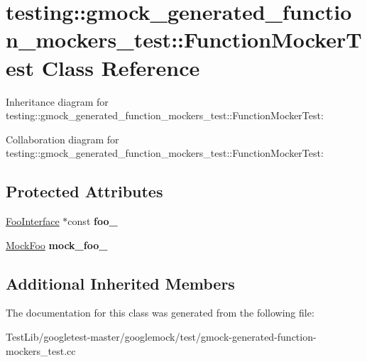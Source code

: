 \hypertarget{classtesting_1_1gmock__generated__function__mockers__test_1_1FunctionMockerTest}{}\section{testing\+:\+:gmock\+\_\+generated\+\_\+function\+\_\+mockers\+\_\+test\+:\+:Function\+Mocker\+Test Class Reference}
\label{classtesting_1_1gmock__generated__function__mockers__test_1_1FunctionMockerTest}


Inheritance diagram for testing\+:\+:gmock\+\_\+generated\+\_\+function\+\_\+mockers\+\_\+test\+:\+:Function\+Mocker\+Test\+:


Collaboration diagram for testing\+:\+:gmock\+\_\+generated\+\_\+function\+\_\+mockers\+\_\+test\+:\+:Function\+Mocker\+Test\+:
\subsection*{Protected Attributes}
\begin{DoxyCompactItemize}
\item 
\mbox{\label{classtesting_1_1gmock__generated__function__mockers__test_1_1FunctionMockerTest_ae2b8b577c4808f2dff9797168468f65f}} 
\hyperlink{classtesting_1_1gmock__generated__function__mockers__test_1_1FooInterface}{Foo\+Interface} $\ast$const {\bfseries foo\+\_\+}
\item 
\mbox{\label{classtesting_1_1gmock__generated__function__mockers__test_1_1FunctionMockerTest_a265659f07a0e75152ab295add4769585}} 
\hyperlink{classtesting_1_1gmock__generated__function__mockers__test_1_1MockFoo}{Mock\+Foo} {\bfseries mock\+\_\+foo\+\_\+}
\end{DoxyCompactItemize}
\subsection*{Additional Inherited Members}


The documentation for this class was generated from the following file\+:\begin{DoxyCompactItemize}
\item 
Test\+Lib/googletest-\/master/googlemock/test/gmock-\/generated-\/function-\/mockers\+\_\+test.\+cc\end{DoxyCompactItemize}
